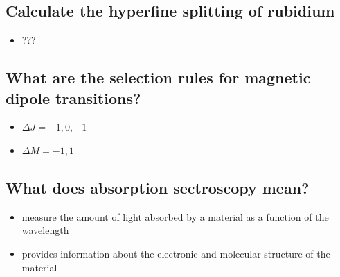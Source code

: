 \subsection{Calculate the hyperfine splitting of rubidium}
\begin{itemize}
    \item ???
\end{itemize}
\subsection{What are the selection rules for magnetic dipole transitions?}
\begin{itemize}
    \item $\Delta J = -1,0,+1$
    \item $\Delta M = -1,1$
\end{itemize}
\subsection{What does absorption sectroscopy mean?}
\begin{itemize}
    \item measure the amount of light absorbed by a material as a function of the wavelength
    \item provides information about the electronic and molecular structure of the material
\end{itemize}